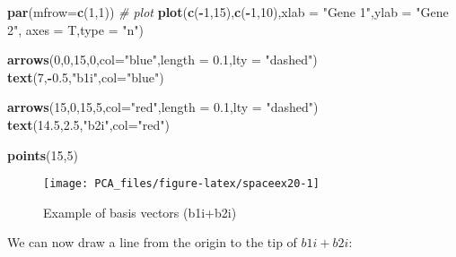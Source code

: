 \documentclass[
]{book}
\newenvironment{Shaded}{\begin{snugshade}}{\end{snugshade}}
\newcommand{\CommentTok}[1]{\textcolor[rgb]{0.56,0.35,0.01}{\textit{#1}}}
\newcommand{\DataTypeTok}[1]{\textcolor[rgb]{0.13,0.29,0.53}{#1}}
\newcommand{\DecValTok}[1]{\textcolor[rgb]{0.00,0.00,0.81}{#1}}
\newcommand{\FloatTok}[1]{\textcolor[rgb]{0.00,0.00,0.81}{#1}}
\newcommand{\KeywordTok}[1]{\textcolor[rgb]{0.13,0.29,0.53}{\textbf{#1}}}
\newcommand{\NormalTok}[1]{#1}
\newcommand{\OperatorTok}[1]{\textcolor[rgb]{0.81,0.36,0.00}{\textbf{#1}}}
\newcommand{\StringTok}[1]{\textcolor[rgb]{0.31,0.60,0.02}{#1}}
\theoremstyle{definition}
\theoremstyle{definition}
\theoremstyle{definition}
\theoremstyle{remark}
\begin{document}
\begin{Shaded}
\begin{Highlighting}[]
\KeywordTok{par}\NormalTok{(}\DataTypeTok{mfrow=}\KeywordTok{c}\NormalTok{(}\DecValTok{1}\NormalTok{,}\DecValTok{1}\NormalTok{))}
\CommentTok{# plot}
\KeywordTok{plot}\NormalTok{(}\KeywordTok{c}\NormalTok{(}\OperatorTok{-}\DecValTok{1}\NormalTok{,}\DecValTok{15}\NormalTok{),}\KeywordTok{c}\NormalTok{(}\OperatorTok{-}\DecValTok{1}\NormalTok{,}\DecValTok{10}\NormalTok{),}\DataTypeTok{xlab =} \StringTok{"Gene 1"}\NormalTok{,}\DataTypeTok{ylab =} \StringTok{"Gene 2"}\NormalTok{,}
 \DataTypeTok{axes =}\NormalTok{ T,}\DataTypeTok{type =} \StringTok{"n"}\NormalTok{)}

\KeywordTok{arrows}\NormalTok{(}\DecValTok{0}\NormalTok{,}\DecValTok{0}\NormalTok{,}\DecValTok{15}\NormalTok{,}\DecValTok{0}\NormalTok{,}\DataTypeTok{col=}\StringTok{"blue"}\NormalTok{,}\DataTypeTok{length =} \FloatTok{0.1}\NormalTok{,}\DataTypeTok{lty =} \StringTok{"dashed"}\NormalTok{)}
\KeywordTok{text}\NormalTok{(}\DecValTok{7}\NormalTok{,}\OperatorTok{-}\FloatTok{0.5}\NormalTok{,}\StringTok{"b1i"}\NormalTok{,}\DataTypeTok{col=}\StringTok{"blue"}\NormalTok{)}

\KeywordTok{arrows}\NormalTok{(}\DecValTok{15}\NormalTok{,}\DecValTok{0}\NormalTok{,}\DecValTok{15}\NormalTok{,}\DecValTok{5}\NormalTok{,}\DataTypeTok{col=}\StringTok{"red"}\NormalTok{,}\DataTypeTok{length =} \FloatTok{0.1}\NormalTok{,}\DataTypeTok{lty =} \StringTok{"dashed"}\NormalTok{)}
\KeywordTok{text}\NormalTok{(}\FloatTok{14.5}\NormalTok{,}\FloatTok{2.5}\NormalTok{,}\StringTok{"b2i"}\NormalTok{,}\DataTypeTok{col=}\StringTok{"red"}\NormalTok{)}

\KeywordTok{points}\NormalTok{(}\DecValTok{15}\NormalTok{,}\DecValTok{5}\NormalTok{)}
\end{Highlighting}
\end{Shaded}

\begin{figure}

{\centering \texttt{[image: PCA\_files/figure-latex/spaceex20-1]} 

}

\caption{Example of basis vectors (b1i+b2i)}\label{fig:spaceex20}
\end{figure}

We can now draw a line from the origin to the tip of \(b1i+b2i\):
\end{document}
